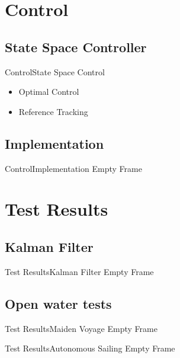 \documentclass[10pt]{beamer}
\begin{document}
\section{Control}
\subsection{State Space Controller}
\begin{frame}{Control}{State Space Control}
\begin{itemize}
	\item Optimal Control
	\item Reference Tracking
\end{itemize}
\end{frame}

\subsection{Implementation}
\begin{frame}{Control}{Implementation}
Empty Frame
\end{frame}

\section{Test Results}
\subsection{Kalman Filter}
\begin{frame}{Test Results}{Kalman Filter}
Empty Frame
\end{frame}

\subsection{Open water tests}
\begin{frame}{Test Results}{Maiden Voyage}
Empty Frame
\end{frame}

\begin{frame}{Test Results}{Autonomous Sailing}
Empty Frame
\end{frame}


\end{document}
